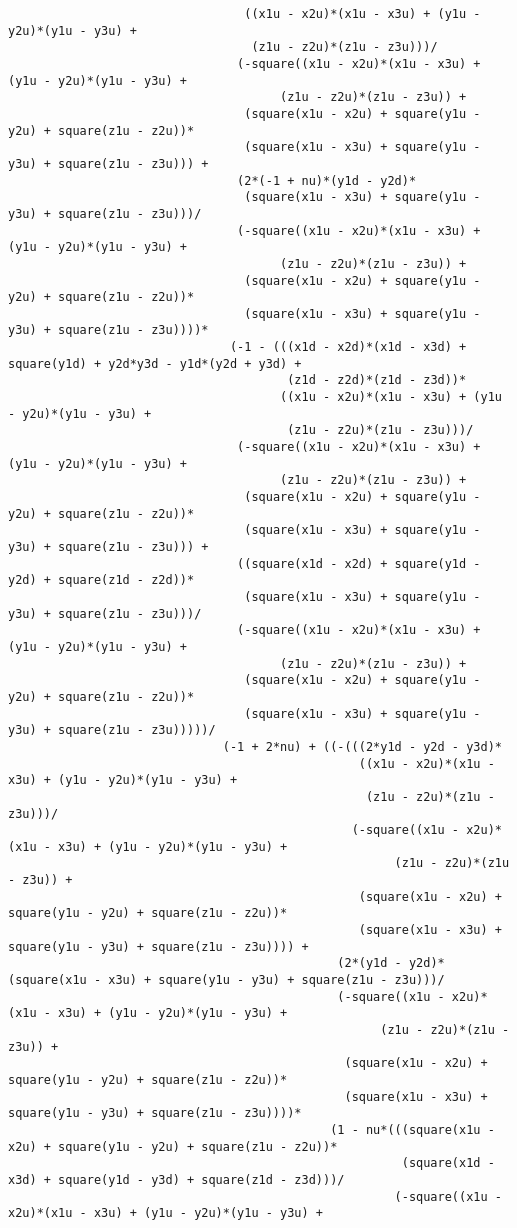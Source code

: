 \begin{lstlisting}
								 ((x1u - x2u)*(x1u - x3u) + (y1u - y2u)*(y1u - y3u) + 
								  (z1u - z2u)*(z1u - z3u)))/
								(-square((x1u - x2u)*(x1u - x3u) + (y1u - y2u)*(y1u - y3u) + 
									  (z1u - z2u)*(z1u - z3u)) + 
								 (square(x1u - x2u) + square(y1u - y2u) + square(z1u - z2u))*
								 (square(x1u - x3u) + square(y1u - y3u) + square(z1u - z3u))) + 
								(2*(-1 + nu)*(y1d - y2d)*
								 (square(x1u - x3u) + square(y1u - y3u) + square(z1u - z3u)))/
								(-square((x1u - x2u)*(x1u - x3u) + (y1u - y2u)*(y1u - y3u) + 
									  (z1u - z2u)*(z1u - z3u)) + 
								 (square(x1u - x2u) + square(y1u - y2u) + square(z1u - z2u))*
								 (square(x1u - x3u) + square(y1u - y3u) + square(z1u - z3u))))*
							   (-1 - (((x1d - x2d)*(x1d - x3d) + square(y1d) + y2d*y3d - y1d*(y2d + y3d) + 
									   (z1d - z2d)*(z1d - z3d))*
									  ((x1u - x2u)*(x1u - x3u) + (y1u - y2u)*(y1u - y3u) + 
									   (z1u - z2u)*(z1u - z3u)))/
								(-square((x1u - x2u)*(x1u - x3u) + (y1u - y2u)*(y1u - y3u) + 
									  (z1u - z2u)*(z1u - z3u)) + 
								 (square(x1u - x2u) + square(y1u - y2u) + square(z1u - z2u))*
								 (square(x1u - x3u) + square(y1u - y3u) + square(z1u - z3u))) + 
								((square(x1d - x2d) + square(y1d - y2d) + square(z1d - z2d))*
								 (square(x1u - x3u) + square(y1u - y3u) + square(z1u - z3u)))/
								(-square((x1u - x2u)*(x1u - x3u) + (y1u - y2u)*(y1u - y3u) + 
									  (z1u - z2u)*(z1u - z3u)) + 
								 (square(x1u - x2u) + square(y1u - y2u) + square(z1u - z2u))*
								 (square(x1u - x3u) + square(y1u - y3u) + square(z1u - z3u)))))/
							  (-1 + 2*nu) + ((-(((2*y1d - y2d - y3d)*
												 ((x1u - x2u)*(x1u - x3u) + (y1u - y2u)*(y1u - y3u) + 
												  (z1u - z2u)*(z1u - z3u)))/
												(-square((x1u - x2u)*(x1u - x3u) + (y1u - y2u)*(y1u - y3u) + 
													  (z1u - z2u)*(z1u - z3u)) + 
												 (square(x1u - x2u) + square(y1u - y2u) + square(z1u - z2u))*
												 (square(x1u - x3u) + square(y1u - y3u) + square(z1u - z3u)))) + 
											  (2*(y1d - y2d)*(square(x1u - x3u) + square(y1u - y3u) + square(z1u - z3u)))/
											  (-square((x1u - x2u)*(x1u - x3u) + (y1u - y2u)*(y1u - y3u) + 
													(z1u - z2u)*(z1u - z3u)) + 
											   (square(x1u - x2u) + square(y1u - y2u) + square(z1u - z2u))*
											   (square(x1u - x3u) + square(y1u - y3u) + square(z1u - z3u))))*
											 (1 - nu*(((square(x1u - x2u) + square(y1u - y2u) + square(z1u - z2u))*
													   (square(x1d - x3d) + square(y1d - y3d) + square(z1d - z3d)))/
													  (-square((x1u - x2u)*(x1u - x3u) + (y1u - y2u)*(y1u - y3u) + 

\end{lstlisting}
